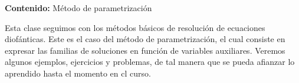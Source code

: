 {\Large\textbf{Contenido:} Método de parametrización}

Esta clase seguimos con los métodos básicos de resolución de ecuaciones diofánticas.
Este es el caso del método de parametrización, el cual consiste en expresar las familias de soluciones en función de variables auxiliares.
Veremos algunos ejemplos, ejercicios y problemas, de tal manera que se pueda afianzar lo aprendido hasta el momento en cl curso.